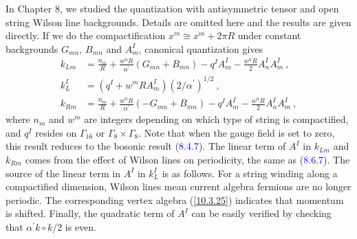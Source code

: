 In Chapter 8, we studied the quantization with antisymmetric tensor and open string Wilson line backgrounds. Details are omitted here and the results are given directly. If we do the compactification $x^{m}\cong x^{m}+2\pi R$ under constant backgrounds $G_{mn}$, $B_{mn}$ and $A_{m}^{I}$, canonical quantization gives
\begin{subequations}
	\begin{align}
		k_{Lm}&= \frac{n_{m}}{R}+\frac{w^{n}R}{\alpha^{\prime}}(G_{mn}+B_{mn})-q^{I}A_{m}^{I}-\frac{w^{n}R}{2}A_{n}^{I}A_{m}^{I}\:,\label{11.6.17a}\\
		k_{L}^{I} &= (q^{I}+w^{m}RA_{m}^{I})(2/\alpha^{\prime})^{1/2} \:, \label{11.6.17b} \\
		k_{Rm}&= \frac{n_{m}}{R}+\frac{w^{n}R}{\alpha^{\prime}}(-G_{mn}+B_{mn})-q^{I}A_{m}^{I}-\frac{w^{n}R}{2}A_{n}^{I}A_{m}^{I}\:,\label{11.6.17c}
	\end{align}
\end{subequations}
where $n_{m}$ and $w^{m}$ are integers depending on which type of string is compactified, and $q^{I}$ resides on $\Gamma_{16}$ or $\Gamma_{8}\times\Gamma_{8}$. Note that when the gauge field is set to zero, this result reduces to the bosonic result (\textcolor{blue}{8.4.7}). The linear term of $A^{I}$ in $k_{Lm}$ and $k_{Rm}$ comes from the effect of Wilson lines on periodicity, the same as (\textcolor{blue}{8.6.7}). The source of the linear term in $A^{I}$ in $k_{L}^{I}$ is as follows. For a string winding along a compactified dimension, Wilson lines mean current algebra fermions are no longer periodic. The corresponding vertex algebra (\ref{10.3.25}) indicates that momentum is shifted. Finally, the quadratic term of $A^{I}$ can be easily verified by checking that $\alpha^{\prime}k\circ k/2$ is even.
